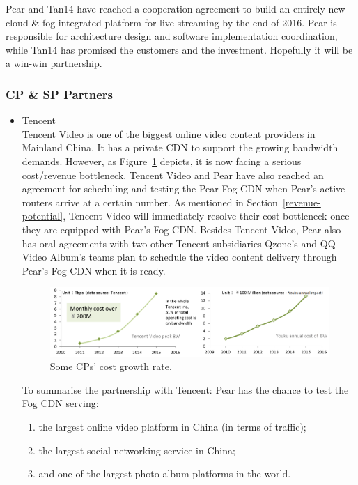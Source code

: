 Pear and Tan14 have reached a cooperation agreement to build an entirely new cloud \& fog integrated platform for live streaming by the end of 2016. Pear is responsible for architecture design and software implementation coordination, while Tan14 has promised the customers and the investment. Hopefully it will be a win-win partnership.

\subsubsection{CP \& SP Partners}

\begin{itemize}
	\item Tencent\\
	Tencent Video is one of the biggest online video content providers in Mainland China. It has a private CDN to support the growing bandwidth demands. However, as Figure~\ref{fig:tencent-youku-cost-growth} depicts, it is now facing a serious cost/revenue bottleneck. Tencent Video and Pear have also reached an agreement for scheduling and testing the Pear Fog CDN when Pear's active routers arrive at a certain number. As mentioned in Section~\ref{revenue-potential}, Tencent Video will immediately resolve their cost bottleneck once they are equipped with Pear's Fog CDN.
	Besides Tencent Video, Pear also has oral agreements with two other Tencent subsidiaries Qzone's and QQ Video Album's teams plan to schedule the video content delivery through Pear's Fog CDN when it is ready.
	\begin{figure}[ht]
		\centering
		\includegraphics[width=1.00\textwidth]{fig/biz/tencent-youku-cost-growth.png}
		\caption{Some CPs' cost growth rate.} \label{fig:tencent-youku-cost-growth}
	\end{figure}
	
	To summarise the partnership with Tencent: Pear has the chance to test the Fog CDN serving:
	\begin{enumerate}
		\item the largest online video platform in China (in terms of traffic); 
		\item the largest social networking service in China;
		\item and one of the largest photo album platforms in the world.
	\end{enumerate}
	

\end{itemize}
